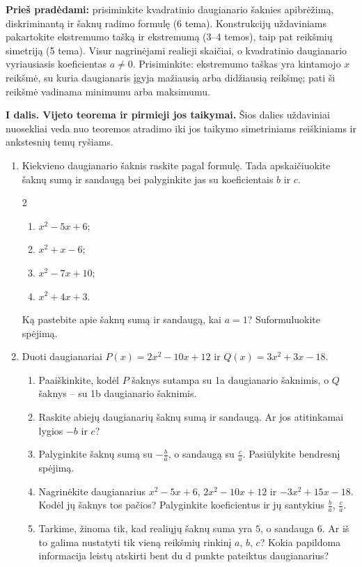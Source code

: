 \documentclass[12pt,a4paper]{article}
\begin{document}
\textbf{Prieš pradėdami:} prisiminkite kvadratinio daugianario šaknies apibrėžimą, diskriminantą ir šaknų radimo formulę (6 tema). Konstrukcijų uždaviniams pakartokite ekstremumo tašką ir ekstremumą (3–4 temos), taip pat reikšmių simetriją (5 tema). Visur nagrinėjami realieji skaičiai, o kvadratinio daugianario vyriausiasis koeficientas $a\ne0$. Prisiminkite: ekstremumo taškas yra kintamojo $x$ reikšmė, su kuria daugianaris įgyja mažiausią arba didžiausią reikšmę; pati ši reikšmė vadinama minimumu arba maksimumu.

\textbf{I dalis. Vijeto teorema ir pirmieji jos taikymai.} Šios dalies uždaviniai nuosekliai veda nuo teoremos atradimo iki jos taikymo simetriniams reiškiniams ir ankstesnių temų ryšiams.
\begin{enumerate}[series=uzdaviniai]
\item Kiekvieno daugianario šaknis raskite pagal formulę. Tada apskaičiuokite šaknų sumą ir sandaugą bei palyginkite jas su koeficientais $b$ ir $c$.
\begin{multicols}{2}\begin{enumerate}
\item $x^2-5x+6$; \item $x^2+x-6$; \item $x^2-7x+10$; \item $x^2+4x+3$.
\end{enumerate}\end{multicols}
Ką pastebite apie šaknų sumą ir sandaugą, kai $a=1$? Suformuluokite spėjimą.
\item Duoti daugianariai $P(x)=2x^2-10x+12$ ir $Q(x)=3x^2+3x-18$.
\begin{enumerate}
\item Paaiškinkite, kodėl $P$ šaknys sutampa su 1a daugianario šaknimis, o $Q$ šaknys – su 1b daugianario šaknimis.
\item Raskite abiejų daugianarių šaknų sumą ir sandaugą. Ar jos atitinkamai lygios $-b$ ir $c$?
\item Palyginkite šaknų sumą su $-\frac{b}{a}$, o sandaugą su $\frac{c}{a}$. Pasiūlykite bendresnį spėjimą.
\item Nagrinėkite daugianarius $x^2-5x+6$, $2x^2-10x+12$ ir $-3x^2+15x-18$. Kodėl jų šaknys tos pačios? Palyginkite koeficientus ir jų santykius $\frac{b}{a}$, $\frac{c}{a}$.
\item Tarkime, žinoma tik, kad realiųjų šaknų suma yra $5$, o sandauga $6$. Ar iš to galima nustatyti tik vieną reikšmių rinkinį $a$, $b$, $c$? Kokia papildoma informacija leistų atskirti bent du d punkte pateiktus daugianarius?

\end{enumerate}
\end{enumerate}
\end{document}
